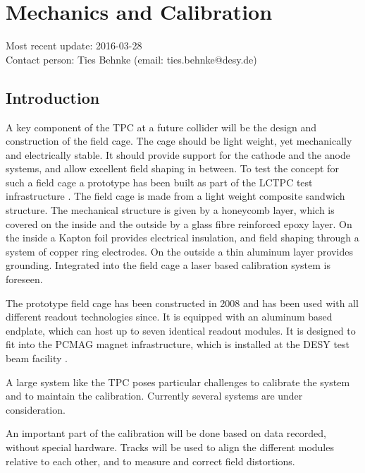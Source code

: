 \section{Mechanics and Calibration}\label{chap:TPC_sec:mechanics}
Most recent update: 2016-03-28\\
Contact person: Ties Behnke (email: ties.behnke@desy.de)\\

\subsection{Introduction}
A key component of the TPC at a future collider will be the design and construction of the field cage. The cage should be light weight, yet mechanically and electrically stable. It should provide support for the cathode and the anode systems, and allow excellent field shaping in between.
To test the concept for such a field cage a prototype has been built as part of the LCTPC test infrastructure \cite{1748-0221-5-10-P10011}. The field cage is made from a light weight composite sandwich structure. The mechanical structure is given by a honeycomb layer, which is covered on the inside and the outside by a glass fibre reinforced epoxy layer. On the inside a Kapton foil provides electrical insulation, and field shaping through a system of copper ring electrodes. On the outside a thin aluminum layer provides grounding. Integrated into the field cage a laser based calibration system is foreseen.

The prototype field cage has been constructed in 2008 and has been used with all different readout technologies since. It is equipped with an aluminum based endplate, which can host up to seven identical readout modules. It is designed to fit into the PCMAG magnet \cite{Yamamoto199475} infrastructure, which is installed at the DESY test beam facility \cite{DESY2TB}.


A large system like the TPC poses particular challenges to calibrate the system and to maintain the calibration. Currently several systems are under consideration.

An important part of the calibration will be done based on data recorded, without special hardware. Tracks will be used to align the different modules relative to each other, and to measure and correct field distortions.

